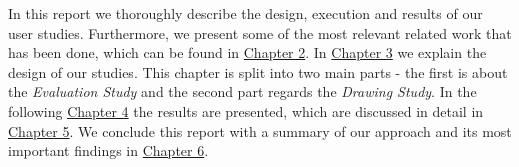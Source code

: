 In this report we thoroughly describe the design, execution and results of our user studies. Furthermore, we present some of the most relevant related work that has been done, which can be found in \hyperref[ch:related]{Chapter 2}. In \hyperref[ch:method]{Chapter 3} we explain the design of our studies. This chapter is split into two main parts - the first is about the \textit{Evaluation Study} and the second part regards the \textit{Drawing Study}. In the following \hyperref[ch:results]{Chapter 4} the results are presented, which are discussed in detail in \hyperref[ch:discussion]{Chapter 5}. We conclude this report with a summary of our approach and its most important findings in \hyperref[ch:conclusion]{Chapter 6}. 